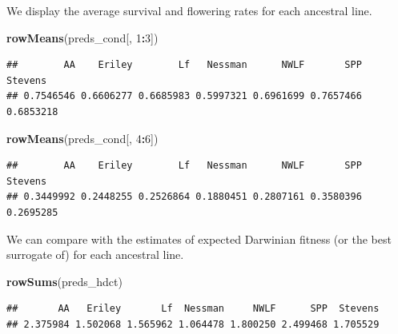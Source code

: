 \documentclass[
  ignorenonframetext,
]{beamer}
\newenvironment{Shaded}{\begin{snugshade}}{\end{snugshade}}
\newcommand{\DecValTok}[1]{\textcolor[rgb]{0.00,0.00,0.81}{#1}}
\newcommand{\FunctionTok}[1]{\textcolor[rgb]{0.13,0.29,0.53}{\textbf{#1}}}
\newcommand{\NormalTok}[1]{#1}
\newcommand{\SpecialCharTok}[1]{\textcolor[rgb]{0.81,0.36,0.00}{\textbf{#1}}}
\begin{document}
\begin{frame}[fragile]{}
\protect\hypertarget{section-40}{}
We display the average survival and flowering rates for each ancestral
line.

\vspace{12pt}
\tiny

\begin{Shaded}
\begin{Highlighting}[]
\FunctionTok{rowMeans}\NormalTok{(preds\_cond[, }\DecValTok{1}\SpecialCharTok{:}\DecValTok{3}\NormalTok{])}
\end{Highlighting}
\end{Shaded}

\begin{verbatim}
##        AA    Eriley        Lf   Nessman      NWLF       SPP   Stevens 
## 0.7546546 0.6606277 0.6685983 0.5997321 0.6961699 0.7657466 0.6853218
\end{verbatim}

\begin{Shaded}
\begin{Highlighting}[]
\FunctionTok{rowMeans}\NormalTok{(preds\_cond[, }\DecValTok{4}\SpecialCharTok{:}\DecValTok{6}\NormalTok{])}
\end{Highlighting}
\end{Shaded}

\begin{verbatim}
##        AA    Eriley        Lf   Nessman      NWLF       SPP   Stevens 
## 0.3449992 0.2448255 0.2526864 0.1880451 0.2807161 0.3580396 0.2695285
\end{verbatim}

\vspace{12pt}
\normalsize

We can compare with the estimates of expected Darwinian fitness (or the
best surrogate of) for each ancestral line.

\vspace{12pt}
\tiny

\begin{Shaded}
\begin{Highlighting}[]
\FunctionTok{rowSums}\NormalTok{(preds\_hdct)}
\end{Highlighting}
\end{Shaded}

\begin{verbatim}
##       AA   Eriley       Lf  Nessman     NWLF      SPP  Stevens 
## 2.375984 1.502068 1.565962 1.064478 1.800250 2.499468 1.705529
\end{verbatim}
\end{frame}
\end{document}
